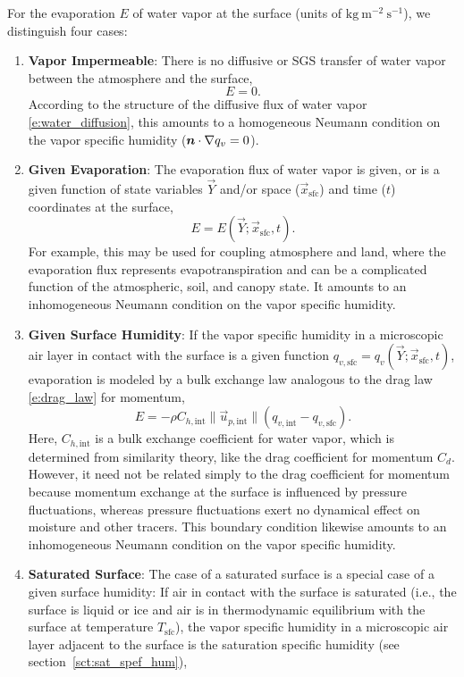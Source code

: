 \documentclass{report}
\begin{document}
For the evaporation $E$ of water vapor at the surface (units of $\mathrm{kg~m^{-2}~s^{-1}}$), we distinguish four cases:
\begin{enumerate}
    \item \textbf{Vapor Impermeable}: There is no diffusive or SGS transfer of water vapor between the atmosphere and the surface,
    \[
    E = 0.
    \]
    According to the structure of the diffusive flux of water vapor \eqref{e:water_diffusion}, this amounts to a homogeneous Neumann condition on the vapor specific humidity ($\boldsymbol{{n}}\cdot\nabla q_v = 0$).
    \item \textbf{Given Evaporation}: The evaporation flux of water vapor is given, or is a given function of state variables $\vec{Y}$ and/or space ($\vec{x}_\mathrm{sfc}$) and time ($t$) coordinates at the surface,
    \[
    E = E(\vec{Y}; \vec{x}_\mathrm{sfc}, t).
    \]
    For example, this may be used for coupling atmosphere and land, where the evaporation flux represents evapotranspiration and can be a complicated function of the atmospheric, soil, and canopy state. It amounts to an inhomogeneous Neumann condition on the vapor specific humidity.
    \item \textbf{Given Surface Humidity}: If the vapor specific humidity in a microscopic air layer in contact with the surface is a given function $q_{v, \mathrm{sfc}} = q_{v}(\vec{Y}; \vec{x}_\mathrm{sfc}, t)$, evaporation is modeled by a bulk exchange law analogous to the drag law \eqref{e:drag_law} for momentum,
    \begin{equation}\label{e:sfc_evaporation}
    E = - \rho C_{h, \mathrm{int}} \| \vec{u}_{p, \mathrm{int}} \| \left( q_{v, \mathrm{int}} - q_{v, \mathrm{sfc}} \right).
    \end{equation} 
    Here, $C_{h, \mathrm{int}}$ is a bulk exchange coefficient for water vapor, which is determined from similarity theory, like the drag coefficient for momentum $C_d$. However, it need not be related simply to the drag coefficient for momentum because momentum exchange at the surface is influenced by pressure fluctuations, whereas pressure fluctuations exert no dynamical effect on moisture and other tracers. This boundary condition likewise amounts to an inhomogeneous Neumann condition on the vapor specific humidity.
    \item \textbf{Saturated Surface}: The case of a saturated surface is a special case of a given surface humidity: If air in contact with the surface is saturated (i.e., the surface is liquid or ice and air is in thermodynamic equilibrium with the surface at temperature $T_\mathrm{sfc}$), the vapor specific humidity in a microscopic air layer adjacent to the surface is the saturation specific humidity (see section~\ref{sct:sat_spef_hum}),

\end{enumerate}
\end{document}
